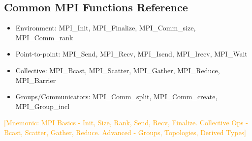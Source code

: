 \documentclass[12pt]{article}
\begin{document}
\subsection*{Common MPI Functions Reference}
\begin{itemize}
    \item Environment: MPI\_Init, MPI\_Finalize, MPI\_Comm\_size, MPI\_Comm\_rank
    \item Point-to-point: MPI\_Send, MPI\_Recv, MPI\_Isend, MPI\_Irecv, MPI\_Wait
    \item Collective: MPI\_Bcast, MPI\_Scatter, MPI\_Gather, MPI\_Reduce, MPI\_Barrier
    \item Groups/Communicators: MPI\_Comm\_split, MPI\_Comm\_create, MPI\_Group\_incl
\end{itemize}

\textcolor{orange}{[Mnemonic: MPI Basics - Init, Size, Rank, Send, Recv, Finalize. Collective Ops - Bcast, Scatter, Gather, Reduce. Advanced - Groups, Topologies, Derived Types]}
\end{document}
